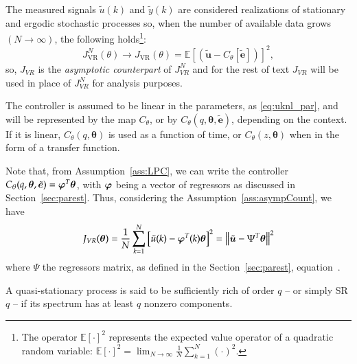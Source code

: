 \begin{assum} \label{ass:asympCount}
   The measured signals $\tilde{u}(k)$ and $\tilde{y}(k)$ are considered realizations of stationary and ergodic stochastic processes so, when the number of available data grows $(N \to \infty)$, the following holds\footnote{The operator $\mathbb{E}[\cdot]^{2}$ represents the expected value operator of a quadratic random variable: $\mathbb{E}[\cdot]^{2} = \lim_{N\to \infty} \frac{1}{N}\sum_{k=1}^{N} \left( \cdot \right)^{2}$.}:
   $$ J_{\mathrm{VR}}^{N}(\theta) \rightarrow J_{\mathrm{VR}}(\theta)=\mathbb{E}\left[ \left(\tilde{\bm{u}}-C_\theta[\tilde{\bm{e}} ]\right)\right]^{2}, $$
   so,  $J_{VR}$ is the \textit{asymptotic counterpart} of $J_{VR}^N$ and for the rest of text $J_{VR}$ will be used in place of $J_{VR}^N$ for analysis purposes.
\end{assum}

\begin{assum} \label{ass:LPC}
   The controller is assumed to be linear in the parameters, as \eqref{eq:uknl_par}, and will be represented by the map $C_{\theta}$, or by $C_\theta(q, \bm{\theta}, \tilde{\bm{e}} )$, depending on the context. If it is linear, $C_\theta(q,\bm{\theta})$ is used as a function of time, or $C_\theta(z,\bm{\theta})$ when in the form of a transfer function.
\end{assum}

Note that, from Assumption~\ref{ass:LPC}, we can write the controller $C_\theta(q,\bm{\theta},\tilde{\bm{e}}) = \bm{\bm{\varphi}}^{T}\bm{\theta}$, with $\bm{\bm{\varphi}}$ being a vector of regressors as discussed in Section~\ref{sec:parest}. Thus, considering the Assumption~\ref{ass:asympCount}, we have
\begin{equation}
   J_{VR}(\bm{\theta}) = \frac{1}{N}\sum_{k=1}^{N} \left[ \tilde{u}(k) - \bm{\varphi}^{T}(k)\bm{\theta} \right]^{2} = \left\lVert\tilde{\bm{u}}-\Psi^T\bm{\theta}\right\rVert^{2}
\label{eq:JVR_reg}
\end{equation}
where $\Psi$ the regressors matrix, as defined in the Section~\ref{sec:parest}, equation~.

\begin{defn} \label{def:SRq}
   A quasi-stationary process is said to be sufficiently rich of order $q$ -- or simply SR$q$ -- if its spectrum has at least $q$ nonzero components.
\end{defn}

